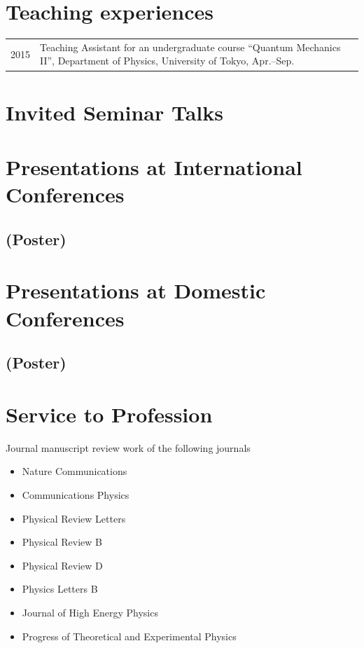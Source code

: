 \documentclass[12pt]{article}
\begin{document}
\section*{Teaching experiences}
\begin{table}[H]
  \begin{tabular}{lp{6in}}
    2015 & Teaching Assistant for an undergraduate course ``Quantum Mechanics II'', Department of Physics, University of Tokyo, Apr.--Sep.
  \end{tabular}
\end{table}



\nocite{*}

\section*{Invited Seminar Talks}

\section*{Presentations at International Conferences}

\subsection*{(Poster)}

\section*{Presentations at Domestic Conferences}

\subsection*{(Poster)}

\section*{Service to Profession}
\vspace*{1em}
Journal manuscript review work of the following journals
\begin{itemize}
  \setlength\itemsep{0em}
  \item Nature Communications
  \item Communications Physics
  \item Physical Review Letters
  \item Physical Review B
  \item Physical Review D
  \item Physics Letters B
  \item Journal of High Energy Physics
  \item Progress of Theoretical and Experimental Physics
\end{itemize}
\end{document}

